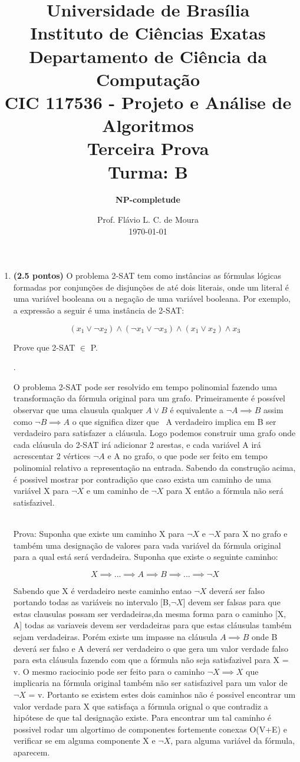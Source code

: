 \documentclass[12pt]{article}
\title{{\large Universidade de Brasília \\ Instituto de Ciências Exatas \\
Departamento de Ciência da Computação} \\[1cm]
CIC 117536 - Projeto e Análise de Algoritmos \\[.5cm]  Terceira Prova \\[.5cm] Turma: B}
\author{{\bf NP-completude}}
\date{Prof. Flávio L. C. de Moura \\[.5cm] \today}
\newcommand{\resposta}[1]{ \noindent {\bf Solução}.{\color{blue} #1}}
\begin{document}
\maketitle

\begin{enumerate}
\item {\bf (2.5 pontos)} O problema 2-SAT tem como instâncias as
  fórmulas lógicas formadas por conjunções de disjunções de até dois
  literais, onde um literal é uma variável booleana ou a negação de
  uma variável booleana. Por exemplo, a expressão a seguir é uma
  instância de 2-SAT:

  $$(x_1\lor \neg x_2)\land (\neg x_1 \lor \neg x_3) \land (x_1 \lor x_2) \land x_3$$

  Prove que 2-SAT $\in$ P.

 
  \resposta{
    O problema 2-SAT pode ser resolvido em tempo polinomial fazendo uma transformação da fórmula original para um grafo. Primeiramente é possível observar que uma clausula
    qualquer \(A \lor B\) é equivalente a \(\neg A \implies B\) assim como \(\neg B \implies A\) o que significa dizer que ~A verdadeiro implica em B ser verdadeiro para satisfazer a cláusula. Logo podemos
    construir uma grafo onde cada cláusula do 2-SAT irá adicionar 2 arestas, e cada variável A irá acrescentar 2 vértices \(\neg A\) e A no grafo, o que pode ser feito em tempo polinomial relativo a representação na entrada. Sabendo da construção acima, é possivel mostrar por contradição que caso exista um caminho de uma variável X para \(\neg X\) e um caminho de \(\neg X\) para X então a fórmula não será satisfazivel.

\\ Prova:
	Suponha que existe um caminho X para \(\neg X\) e \(\neg X\) para X no grafo e também uma designação de valores para vada variável da fórmula original para a qual está será verdadeira. Suponha que existe o seguinte caminho:
			
\[X \implies ... \implies A \implies B \implies ... \implies \neg X\]
		
    Sabendo que X é verdadeiro neste caminho entao \(\neg X\) deverá ser falso portando todas as variáveis no intervalo [B,\(\neg X\)] devem ser falsas para que estas clausulas possam ser verdadeiras,da mesma forma para o caminho [X, A] todas as variaveis devem ser verdadeiras para que estas cláusulas também sejam verdadeiras. Porém existe um impasse na cláusula \(A \implies B\) onde B deverá ser falso e A deverá ser verdadeiro o que gera um valor verdade falso para esta cláusula fazendo com que a fórmula não seja satisfazivel para X = v. O mesmo raciocinio pode ser feito para o caminho \(\neg X \implies X\) que implicaria na fórmula original também não ser satisfazivel para um valor de \(\neg X\) = v. Portanto se existem estes dois caminhos não é possivel encontrar um valor verdade para X que satisfaça a fórmula orignal o que contradiz a hipótese de que tal designação existe. Para encontrar um tal caminho é possivel rodar um algortimo de componentes fortemente conexas O(V+E) e verificar se em alguma componente X e \(\neg X\), para alguma variável da fórmula, aparecem.
    
}
\end{enumerate}
\end{document}
